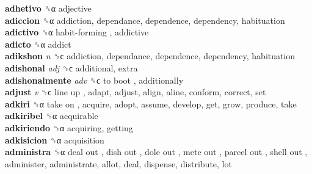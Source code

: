 \textbf{adhetivo} ␝α  adjective  \\
\textbf{adiccion} ␝α  addiction, dependance, dependence, dependency, habituation  \\
\textbf{adictivo} ␝α   habit-forming , addictive  \\
\textbf{adicto} ␝α  addict  \\
\textbf{adikshon} \emph{n}  ␝ϲ  addiction, dependance, dependence, dependency, habituation  \\
\textbf{adishonal} \emph{adj}  ␝ϲ  additional, extra  \\
\textbf{adishonalmente} \emph{adv}  ␝ϲ   to boot , additionally  \\
\textbf{adjust} \emph{v}  ␝ϲ   line up , adapt, adjust, align, aline, conform, correct, set  \\
\textbf{adkiri} ␝α   take on , acquire, adopt, assume, develop, get, grow, produce, take  \\
\textbf{adkiribel} ␝α  acquirable  \\
\textbf{adkiriendo} ␝α  acquiring, getting  \\
\textbf{adkisicion} ␝α  acquisition  \\
\textbf{administra} ␝α   deal out ,  dish out ,  dole out ,  mete out ,  parcel out ,  shell out , administer, administrate, allot, deal, dispense, distribute, lot  \\
